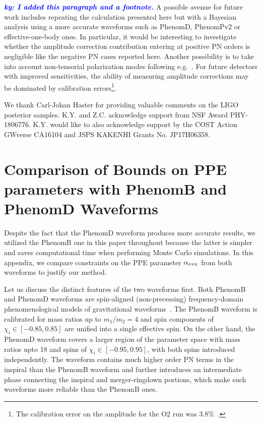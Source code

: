 \documentclass[prd,twocolumn,nofootinbib]{revtex4-1}
\newcommand{\PPE}{{\mbox{\tiny PPE}}}
\newcommand{\ky}[1]{\textcolor{blue}{\it{\textbf{ky: #1}}} }
\begin{document}
\ky{I added this paragraph and a footnote.}
A possible avenue for future work includes repeating the calculation presented here but with a Bayesian analysis using a more accurate waveforms such as PhenomD, PhenomPv2 or effective-one-body ones. In particular, it would be interesting to investigate whether the amplitude correction contribution entering at positive PN orders is negligible like the negative PN cases reported here. Another possibility is to take into account non-tensorial polarization modes following e.g.~\cite{Chatziioannou:2012rf}. For future detectors with improved sensitivities, the ability of measuring amplitude corrections may be dominated by calibration errors\footnote{The calibration error on the amplitude for the O2 run was 3.8\%~\cite{LIGOScientific:2018mvr}.}. 


\acknowledgments

We thank Carl-Johan Haster for providing valuable comments on the LIGO posterior samples. 
K.Y. and Z.C. acknowledge support from NSF Award PHY-1806776. 
K.Y. would like to also acknowledge support by the COST Action GWverse CA16104 and JSPS KAKENHI Grants No. JP17H06358.

 \appendix 
\section{Comparison of Bounds on PPE parameters with PhenomB and PhenomD Waveforms}\label{Appendix}

Despite the fact that the PhenomD waveform produces more accurate results, we utilized the PhenomB one in this paper throughout because the latter is simpler and saves computational time when performing Monte Carlo simulations. In this appendix, we compare constraints on the PPE parameter $\alpha_\PPE$ from both waveforms to justify our method. 
 
Let us discuss the distinct features of the two waveforms first. Both PhenomB and PhenomD waveforms are spin-aligned (non-precessing) frequency-domain phenomenological models of gravitational waveforms~\cite{Ajith:2009bn,Khan:2015jqa}. The PhenomB waveform is calibrated for mass ratios up to $m_1/m_2 = 4$ and spin components of $\chi_i\in[-0.85,0.85]$ are unified into a single effective spin. On the other hand, the PhenomD waveform covers a larger region of the parameter space with mass ratios upto 18 and spins of $\chi_i\in[-0.95,0.95]$, with both spins introduced independently. The waveform contains much higher order PN terms in the inspiral than the PhenomB waveform and further introduces an intermediate phase connecting the inspiral and merger-ringdown portions,
which make such waveforms more reliable than the PhenomB ones.
\end{document}
